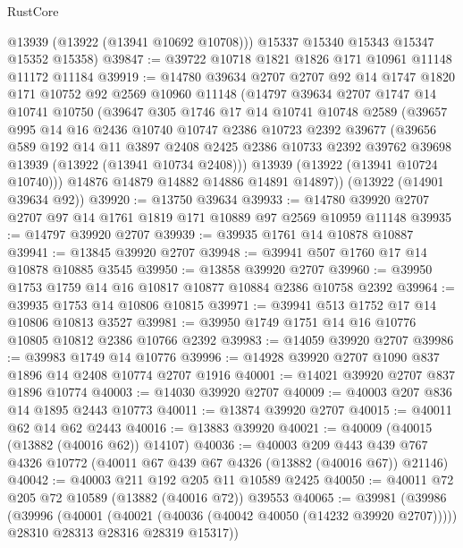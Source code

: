 \begin{lexlean}{RustCore}
\begin{coremodule}
        @13939
        (@13922 (@13941 @10692 @10708)))
      @15337
      @15340
      @15343
      @15347
      @15352
      @15358)
@39847 := @39722 @10718 @1821 @1826 @171 @10961 @11148 @11172 @11184
@39919 := @14780
    @39634
    @2707
    @2707
    @92
    @14
    @1747
    @1820
    @171
    @10752
    @92
    @2569
    @10960
    @11148
    (@14797
      @39634
      @2707
      @1747
      @14
      @10741
      @10750
      (@39647
        @305
        @1746
        @17
        @14
        @10741
        @10748
        @2589
        (@39657
          @995
          @14
          @16
          @2436
          @10740
          @10747
          @2386
          @10723
          @2392
          @39677
          (@39656
            @589
            @192
            @14
            @11
            @3897
            @2408
            @2425
            @2386
            @10733
            @2392
            @39762
            @39698
            @13939
            (@13922 (@13941 @10734 @2408)))
          @13939
          (@13922 (@13941 @10724 @10740)))
        @14876
        @14879
        @14882
        @14886
        @14891
        @14897))
    (@13922 (@14901 @39634 @92))
@39920 := @13750 @39634
@39933 := @14780 @39920 @2707 @2707 @97 @14 @1761 @1819 @171 @10889 @97 @2569 @10959 @11148
@39935 := @14797 @39920 @2707
@39939 := @39935 @1761 @14 @10878 @10887
@39941 := @13845 @39920 @2707
@39948 := @39941 @507 @1760 @17 @14 @10878 @10885 @3545
@39950 := @13858 @39920 @2707
@39960 := @39950 @1753 @1759 @14 @16 @10817 @10877 @10884 @2386 @10758 @2392
@39964 := @39935 @1753 @14 @10806 @10815
@39971 := @39941 @513 @1752 @17 @14 @10806 @10813 @3527
@39981 := @39950 @1749 @1751 @14 @16 @10776 @10805 @10812 @2386 @10766 @2392
@39983 := @14059 @39920 @2707
@39986 := @39983 @1749 @14 @10776
@39996 := @14928 @39920 @2707 @1090 @837 @1896 @14 @2408 @10774 @2707 @1916
@40001 := @14021 @39920 @2707 @837 @1896 @10774
@40003 := @14030 @39920 @2707
@40009 := @40003 @207 @836 @14 @1895 @2443 @10773
@40011 := @13874 @39920 @2707
@40015 := @40011 @62 @14 @62 @2443
@40016 := @13883 @39920
@40021 := @40009 (@40015 (@13882 (@40016 @62)) @14107)
@40036 := @40003
    @209
    @443
    @439
    @767
    @4326
    @10772
    (@40011 @67 @439 @67 @4326 (@13882 (@40016 @67)) @21146)
@40042 := @40003 @211 @192 @205 @11 @10589 @2425
@40050 := @40011 @72 @205 @72 @10589 (@13882 (@40016 @72)) @39553
@40065 := @39981
    (@39986
      (@39996
        (@40001 (@40021 (@40036 (@40042 @40050 (@14232 @39920 @2707)))))
        @28310
        @28313
        @28316
        @28319
        @15317))

\end{coremodule}
\end{lexlean}
